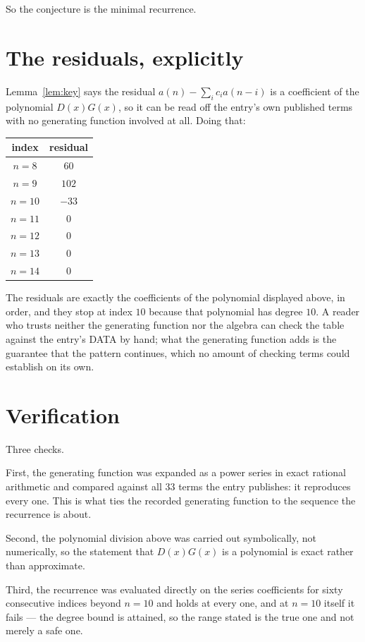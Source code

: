 \documentclass[11pt,a4paper]{article}
\theoremstyle{plain}
\theoremstyle{definition}
\begin{document}
So the conjecture is the minimal recurrence.

\section{The residuals, explicitly}

Lemma~\ref{lem:key} says the residual $a(n)-\sum_ic_ia(n-i)$ is a coefficient of the
polynomial $D(x)G(x)$, so it can be read off the entry's own published terms with no
generating function involved at all. Doing that:
\begin{center}
\begin{tabular}{cc}
index & residual \\ \hline
$n=8$ & $60$ \\
$n=9$ & $102$ \\
$n=10$ & $-33$ \\
$n=11$ & $0$ \\
$n=12$ & $0$ \\
$n=13$ & $0$ \\
$n=14$ & $0$
\end{tabular}
\end{center}
The residuals are exactly the coefficients of the polynomial displayed above, in order, and
they stop at index $10$ because that polynomial has degree $10$. A reader who trusts
neither the generating function nor the algebra can check the table against the entry's DATA
by hand; what the generating function adds is the guarantee that the pattern continues, which
no amount of checking terms could establish on its own.

\section{Verification}

Three checks.

First, the generating function was expanded as a power series in exact rational arithmetic and
compared against all $33$ terms the entry publishes: it reproduces every one. This is
what ties the recorded generating function to the sequence the recurrence is about.

Second, the polynomial division above was carried out symbolically, not numerically, so the
statement that $D(x)G(x)$ is a polynomial is exact rather than approximate.

Third, the recurrence was evaluated directly on the series coefficients for sixty consecutive
indices beyond $n=10$ and holds at every one, and at $n=10$ itself it fails --- the
degree bound is attained, so the range stated is the true one and not merely a safe one.
\end{document}
